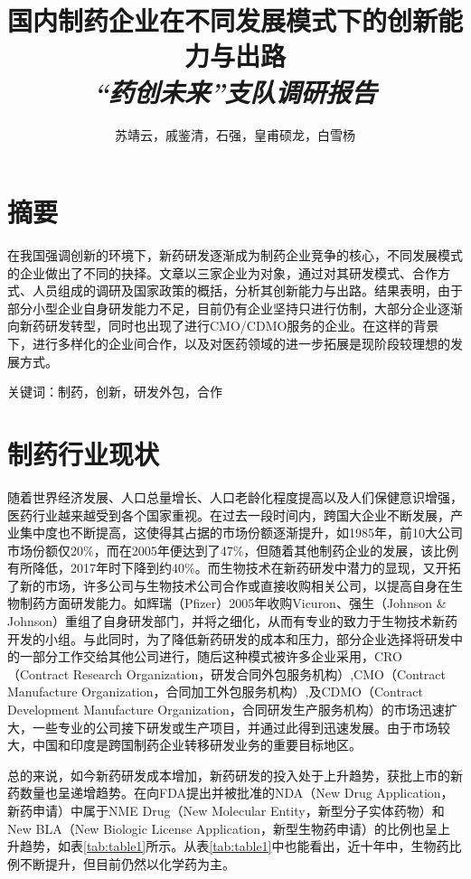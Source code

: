 \documentclass[twocolumn]{ctexbook}
\title{\textbf{国内制药企业在不同发展模式下的创新能力与出路}\\{\textit{“药创未来”支队调研报告}}}
\author{苏靖云，戚鉴清，石强，皇甫硕龙，白雪杨}
\begin{document}
\frontmatter
\onecolumn

	
\chapter{摘要}
	

	


	在我国强调创新的环境下，新药研发逐渐成为制药企业竞争的核心，不同发展模式的企业做出了不同的抉择。文章以三家企业为对象，通过对其研发模式、合作方式、人员组成的调研及国家政策的概括，分析其创新能力与出路。结果表明，由于部分小型企业自身研发能力不足，目前仍有企业坚持只进行仿制，大部分企业逐渐向新药研发转型，同时也出现了进行CMO/CDMO服务的企业。在这样的背景下，进行多样化的企业间合作，以及对医药领域的进一步拓展是现阶段较理想的发展方式。
	
	关键词：制药，创新，研发外包，合作



\tableofcontents
\twocolumn
\mainmatter

\chapter{制药行业现状}

随着世界经济发展、人口总量增长、人口老龄化程度提高以及人们保健意识增强，医药行业越来越受到各个国家重视。在过去一段时间内，跨国大企业不断发展，产业集中度也不断提高，这使得其占据的市场份额逐渐提升，如1985年，前10大公司市场份额仅20\%，而在2005年便达到了47\%\citep{RN7}，但随着其他制药企业的发展，该比例有所降低，2017年时下降到约40\%\citep{RN1}。而生物技术在新药研发中潜力的显现，又开拓了新的市场，许多公司与生物技术公司合作或直接收购相关公司，以提高自身在生物制药方面研发能力\citep{RN8}。如辉瑞（Pfizer）2005年收购Vicuron、强生（Johnson \& Johnson）重组了自身研发部门，并将之细化，从而有专业的致力于生物技术新药开发的小组。与此同时，为了降低新药研发的成本和压力，部分企业选择将研发中的一部分工作交给其他公司进行，随后这种模式被许多企业采用，CRO（Contract Research Organization，研发合同外包服务机构）,CMO（Contract Manufacture Organization，合同加工外包服务机构）,及CDMO（Contract Development Manufacture Organization，合同研发生产服务机构）的市场迅速扩大\citep{RN2}，一些专业的公司接下研发或生产项目，并通过此得到迅速发展。由于市场较大，中国和印度是跨国制药企业转移研发业务的重要目标地区\citep{RN7}。

总的来说，如今新药研发成本增加，新药研发的投入处于上升趋势，获批上市的新药数量也呈递增趋势\citep{RN6}。在向FDA提出并被批准的NDA（New Drug Application，新药申请）中属于NME Drug（New Molecular Entity，新型分子实体药物）和New BLA（New Biologic License Application，新型生物药申请）的比例也呈上升趋势，如表\ref{tab:table1}所示\citep{RN15,RN16,RN17,RN18}。从表\ref{tab:table1}中也能看出，近十年中，生物药比例不断提升，但目前仍然以化学药为主。
\end{document}
